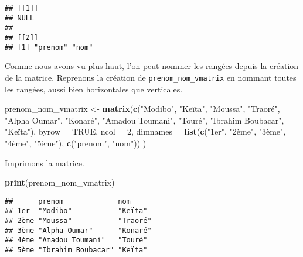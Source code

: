 \documentclass[]{book}
\newenvironment{Shaded}{\begin{snugshade}}{\end{snugshade}}
\newcommand{\KeywordTok}[1]{\textcolor[rgb]{0.13,0.29,0.53}{\textbf{#1}}}
\newcommand{\DataTypeTok}[1]{\textcolor[rgb]{0.13,0.29,0.53}{#1}}
\newcommand{\DecValTok}[1]{\textcolor[rgb]{0.00,0.00,0.81}{#1}}
\newcommand{\StringTok}[1]{\textcolor[rgb]{0.31,0.60,0.02}{#1}}
\newcommand{\OtherTok}[1]{\textcolor[rgb]{0.56,0.35,0.01}{#1}}
\newcommand{\NormalTok}[1]{#1}
\begin{document}
\begin{verbatim}
## [[1]]
## NULL
## 
## [[2]]
## [1] "prenom" "nom"
\end{verbatim}

Comme nous avons vu plus haut, l'on peut nommer les rangées depuis la
création de la matrice. Reprenons la création de
\texttt{prenom\_nom\_vmatrix} en nommant toutes les rangées, aussi bien
horizontales que verticales.

\begin{Shaded}
\begin{Highlighting}[]
\NormalTok{prenom_nom_vmatrix <-}\StringTok{ }\KeywordTok{matrix}\NormalTok{(}\KeywordTok{c}\NormalTok{(}\StringTok{"Modibo"}\NormalTok{, }\StringTok{"Keïta"}\NormalTok{,}
                               \StringTok{"Moussa"}\NormalTok{, }\StringTok{"Traoré"}\NormalTok{,}
                               \StringTok{"Alpha Oumar"}\NormalTok{, }\StringTok{"Konaré"}\NormalTok{, }
                               \StringTok{"Amadou Toumani"}\NormalTok{, }\StringTok{"Touré"}\NormalTok{, }
                               \StringTok{"Ibrahim Boubacar"}\NormalTok{, }\StringTok{"Keïta"}\NormalTok{),}
                             \DataTypeTok{byrow =} \OtherTok{TRUE}\NormalTok{,}
                             \DataTypeTok{ncol =} \DecValTok{2}\NormalTok{,}
                             \DataTypeTok{dimnames =} \KeywordTok{list}\NormalTok{(}\KeywordTok{c}\NormalTok{(}\StringTok{"1er"}\NormalTok{, }\StringTok{"2ème"}\NormalTok{, }\StringTok{"3ème"}\NormalTok{, }\StringTok{"4ème"}\NormalTok{, }\StringTok{"5ème"}\NormalTok{), }
                                             \KeywordTok{c}\NormalTok{(}\StringTok{"prenom"}\NormalTok{, }\StringTok{"nom"}\NormalTok{))}
\NormalTok{                             )}
\end{Highlighting}
\end{Shaded}

Imprimons la matrice.

\begin{Shaded}
\begin{Highlighting}[]
\KeywordTok{print}\NormalTok{(prenom_nom_vmatrix)}
\end{Highlighting}
\end{Shaded}

\begin{verbatim}
##      prenom             nom     
## 1er  "Modibo"           "Keïta" 
## 2ème "Moussa"           "Traoré"
## 3ème "Alpha Oumar"      "Konaré"
## 4ème "Amadou Toumani"   "Touré" 
## 5ème "Ibrahim Boubacar" "Keïta"
\end{verbatim}
\end{document}
